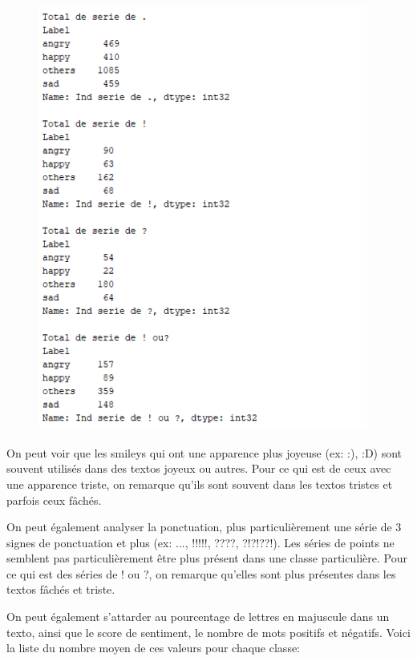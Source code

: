 \begin{figure}[h!]
\begin{minipage}[b]{0.3\textwidth}
	\end{minipage}
	\hfill
	\begin{minipage}[b]{0.3\textwidth}
		\includegraphics[width=\textwidth,height=14cm]{images/analyse_car_ponctuation}
	\end{minipage}
\end{figure}

On peut voir que les smileys qui ont une apparence plus joyeuse (ex: :), :D) sont souvent utilisés dans des textos joyeux ou autres. Pour ce qui est de ceux avec une apparence triste, on remarque qu'ils sont souvent dans les textos tristes et parfois ceux fâchés.

On peut également analyser la ponctuation, plus particulièrement une série de 3 signes de ponctuation et plus (ex: ..., !!!!!, ????, ?!?!??!). Les séries de points ne semblent pas particulièrement être plus présent dans une classe particulière. Pour ce qui est des séries de ! ou ?, on remarque qu'elles sont plus présentes dans les textos fâchés et triste.

On peut également s'attarder au pourcentage de lettres en majuscule dans un texto, ainsi que le score de sentiment, le nombre de mots positifs et négatifs. Voici la liste du nombre moyen de ces valeurs pour chaque classe:

